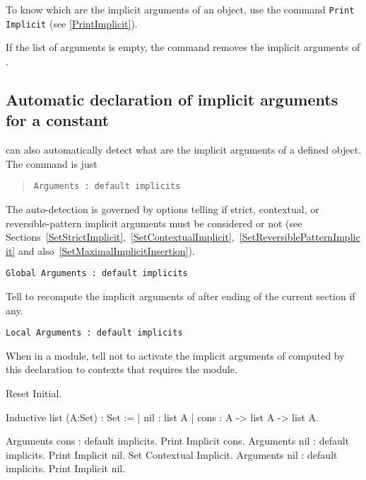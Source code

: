 \Rem To know which are the implicit arguments of an object, use the command
{\tt Print Implicit} (see \ref{PrintImplicit}).

\Rem If the list of arguments is empty, the command removes the
implicit arguments of {\qualid}.

\subsection{Automatic declaration of implicit arguments for a constant}

{\Coq} can also automatically detect what are the implicit arguments
of a defined object. The command is just
\begin{quote}
{\tt Arguments {\qualid} : default implicits
}
\end{quote}
The auto-detection is governed by options telling if strict,
contextual, or reversible-pattern implicit arguments must be
considered or not (see
Sections~\ref{SetStrictImplicit},~\ref{SetContextualImplicit},~\ref{SetReversiblePatternImplicit}
and also~\ref{SetMaximalImplicitInsertion}).

\begin{Variants}
\item {\tt Global Arguments {\qualid} : default implicits
}

Tell to recompute the implicit arguments of {\qualid} after ending of
the current section if any.

\item {\tt Local Arguments {\qualid} : default implicits
}

When in a module, tell not to activate the implicit arguments of
{\qualid} computed by this declaration to contexts that requires the
module.

\end{Variants}

\Example
\begin{coq_eval}
Reset Initial.
\end{coq_eval}
\begin{coq_example*}
Inductive list (A:Set) : Set := 
  | nil : list A 
  | cons : A -> list A -> list A.
\end{coq_example*}
\begin{coq_example}
Arguments cons : default implicits.
Print Implicit cons.
Arguments nil : default implicits.
Print Implicit nil.
Set Contextual Implicit.
Arguments nil : default implicits.
Print Implicit nil.
\end{coq_example}

